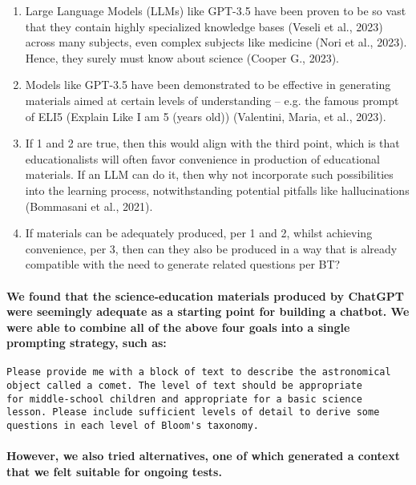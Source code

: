 \documentclass{article}
\begin{document}
\begin{enumerate}
    \item Large Language Models (LLMs) like GPT-3.5 have been proven to be so vast that they contain highly specialized knowledge bases (Veseli et al., 2023) across many subjects, even complex subjects like medicine (Nori et al., 2023). Hence, they surely must know about science (Cooper G., 2023).
    \item Models like GPT-3.5 have been demonstrated to be effective in generating materials aimed at certain levels of understanding – e.g. the famous prompt of ELI5 (Explain Like I am 5 (years old)) (Valentini, Maria, et al., 2023).
    \item If 1 and 2 are true, then this would align with the third point, which is that educationalists will often favor convenience in production of educational materials. If an LLM can do it, then why not incorporate such possibilities into the learning process, notwithstanding potential pitfalls like hallucinations (Bommasani et al., 2021).
    \item If materials can be adequately produced, per 1 and 2, whilst achieving convenience, per 3, then can they also be produced in a way that is already compatible with the need to generate related questions per BT?
\end{enumerate}

\paragraph{We found that the science-education materials produced by ChatGPT were seemingly adequate as a starting point for building a chatbot. We were able to combine all of the above four goals into a single prompting strategy, such as:}

\begin{verbatim}
Please provide me with a block of text to describe the astronomical
object called a comet. The level of text should be appropriate
for middle-school children and appropriate for a basic science
lesson. Please include sufficient levels of detail to derive some
questions in each level of Bloom's taxonomy.
\end{verbatim}

\paragraph{However, we also tried alternatives, one of which generated a context that we felt suitable for ongoing tests.\newline}
\end{document}
